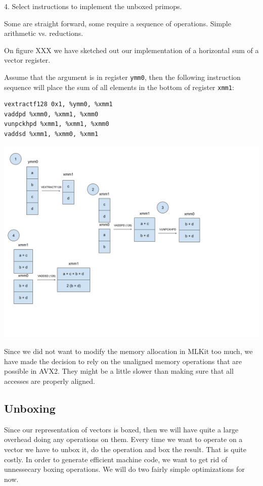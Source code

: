 \documentclass{article}
\begin{document}
4. Select instructions to implement the unboxed primops.

Some are straight forward, some require a sequence of operations. Simple arithmetic vs. reductions.

On figure XXX we have sketched out our implementation of a horizontal sum of a vector register.

Assume that the argument is in register \verb!ymm0!, then the following instruction sequence will place the sum of all elements in the bottom of register \verb!xmm1!:

\begin{verbatim}
vextractf128 0x1, %ymm0, %xmm1
vaddpd %xmm0, %xmm1, %xmm0
vunpckhpd %xmm1, %xmm1, %xmm0
vaddsd %xmm1, %xmm0, %xmm1
\end{verbatim}

\includegraphics[width=\textwidth]{sum.png}


Since we did not want to modify the memory allocation in MLKit too much, we have made the decision to rely on the unaligned memory operations that are possible in AVX2. They might be a little slower than making sure that all accesses are properly aligned.

\subsection{Unboxing}

Since our representation of vectors is boxed, then we will have quite a large overhead doing any operations on them. Every time we want to operate on a vector we have to unbox it, do the operation and box the result. That is quite costly. In order to generate efficient machine code, we want to get rid of unnessecary boxing operations. We will do two fairly simple optimizations for now.
\end{document}
